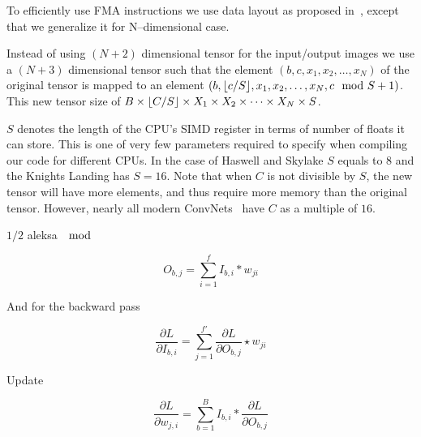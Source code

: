   To efficiently use FMA instructions we use data layout as proposed
  in~\cite{jeffers2016knl, cpu-myth}, except that we generalize it for
  N--dimensional case.

  Instead of using $(N+2)$ dimensional tensor for the input/output
  images we use a $(N+3)$ dimensional tensor such that the element
  $(b,c,x_1,x_2,\dots,x_N)$ of the original tensor is mapped to an
  element $(b,\lfloor c/S\rfloor,x_1,x_2,\dots,x_N,c \mod S + 1)$.  This new
  tensor size of $B \times \lfloor C/S\rfloor \times X_1 \times X_2 \times
  \dots \times X_N \times S$.

  $S$ denotes the length of the CPU's SIMD register in terms of number
  of floats it can store.  This is one of very few parameters required
  to specify when compiling our code for different CPUs.  In the case
  of Haswell and Skylake $S$ equals to $8$ and the Knights Landing has
  $S=16$.  Note that when $C$ is not divisible by $S$, the new tensor
  will have more elements, and thus require more memory than the
  original tensor.  However, nearly all modern ConvNets~ have $C$ as a multiple of $16$.

  $1/2$ aleksa $\mod$



  \[
  O_{b,j} = \sum_{i=1}^f I_{b,i} \ast w_{ji}
  \]

  And for the backward pass

  \[
  \frac{\partial L}{\partial I_{b,i}} = \sum_{j=1}^{f'}
  \frac{\partial L}{\partial O_{b,j}} \star w_{ji}
  \]

  Update


  \[
  \frac{\partial L}{\partial w_{j,i}} = \sum_{b=1}^B I_{b,i} \ast
    \frac{\partial L}{\partial O_{b,j}}
  \]
